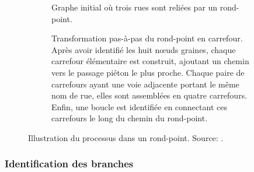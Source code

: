 \begin{figure}[h]
    \centering
    \begin{subfigure}[t]{\columnwidth}
        \centering
        \caption{Graphe initial où trois rues sont reliées par un rond-point.}
    \end{subfigure}
    \begin{subfigure}[t]{\columnwidth}
        \centering
        \caption{Transformation pas-à-pas du rond-point en carrefour. Après avoir identifié les huit nœuds graines, chaque carrefour élémentaire est construit, ajoutant un chemin vers le passage piéton le plus proche. Chaque paire de carrefours ayant une voie adjacente portant le même nom de rue, elles sont assemblées en quatre carrefours. Enfin, une boucle est identifiée en connectant ces carrefours le long du chemin du rond-point.}
    \end{subfigure}
    \caption[Processus de segmentation d'un rond-point]{Illustration du processus dans un rond-point. Source: \citep{Favreau2022}.}
    \label{fig:modelisation_roundAbout}
\end{figure}

\subsubsection{Identification des branches}


